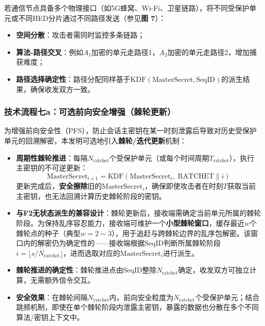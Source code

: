 ﻿\documentclass[12pt,a4paper]{article}
\begin{document}
若通信节点具备多个物理接口（如5G蜂窝、Wi-Fi、卫星链路），将不同受保护单元或不同HED分片通过不同路径发送（参见\textbf{图 7}）：

\begin{itemize}
    \item \textbf{空间分散}：攻击者需同时监控多条链路；
    \item \textbf{算法-路径交叉}：例如$A_1$加密的单元走路径1，$A_2$加密的单元走路径2，增加捕获难度；
    \item \textbf{路径选择确定性}：路径分配同样基于$\text{KDF}(\text{MasterSecret}, \text{SeqID})$的派生结果，确保收发双方一致。
\end{itemize}

\subsubsection*{技术流程七a：可选前向安全增强（棘轮更新）}

为增强前向安全性（PFS），防止会话主密钥在某一时刻泄露后导致对历史受保护单元的回溯解密，本发明可选地引入\textbf{棘轮/迭代更新}机制：

\begin{itemize}
    \item \textbf{周期性棘轮推进}：每隔$N_{\text{ratchet}}$个受保护单元（或每个时间周期$T_{\text{ratchet}}$），执行主密钥的不可逆更新：
    \begin{equation}
        \text{MasterSecret}_{i+1} = \text{KDF}(\text{MasterSecret}_i, \; \text{RATCHET} \| i)
    \end{equation}
    更新完成后，\textbf{安全擦除}旧的$\text{MasterSecret}_i$，确保即使攻击者在时刻$T$获取当前主密钥，也无法回溯计算历史棘轮阶段的密钥。
    \item \textbf{与F2无状态派生的兼容设计}：棘轮更新后，接收端需确定当前单元所属的棘轮阶段。为保持乱序容忍能力，接收端可维护一个\textbf{小型棘轮窗口}，缓存最近$w$个棘轮点的种子（典型$w=2\sim3$），用于追赶与跨棘轮边界的乱序包解密。该窗口内的解密仍为确定性的——接收端根据$\text{SeqID}$判断所属棘轮阶段$i = \lfloor s / N_{\text{ratchet}} \rfloor$，进而选取对应的$\text{MasterSecret}_i$进行派生。
    \item \textbf{棘轮推进的确定性}：棘轮推进点由$\text{SeqID}$整除$N_{\text{ratchet}}$确定，收发双方可独立计算，无需额外信令交互。
    \item \textbf{安全效果}：在棘轮间隔$N_{\text{ratchet}}$内，前向安全粒度为$N_{\text{ratchet}}$个受保护单元；结合跳频机制，即使在单个棘轮阶段内泄露主密钥，暴露的数据也分散在多个不同算法/密钥上下文中。
\end{itemize}
\end{document}
